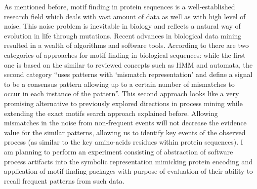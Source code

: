 \documentclass{sig-alternate}
\begin{document}
As mentioned before, motif finding in protein sequences is a well-established research field which deals with vast amount of data as well as with high level of noise. This noise problem is inevitable in biology and reflects a natural way of evolution in life through mutations. Recent advances in biological data mining resulted in a wealth of algorithms and software tools.  According to \cite{citeulike:964046} there are two categories of approaches for motif finding in biological sequences: while the first one is based on the similar to reviewed concepts such as HMM and automata, the second category ``uses patterns with `mismatch representation' and define a signal to be a consensus pattern allowing up to a certain number of mismatches to occur in each instance of the pattern''. This second approach looks like a very promising alternative to previously explored directions in process mining while extending the exact motifs search approach explained before. Allowing mismatches in the noise from non-frequent events will not decrease the evidence value for the similar patterns, allowing us to identify key events of the observed process (as similar to the key amino-acids residues within protein sequences). I am planning to perform an experiment consisting of abstraction of software process artifacts into the symbolic representation mimicking protein encoding and application of motif-finding packages with purpose of evaluation of their ability to recall frequent patterns from such data.
\end{document}
